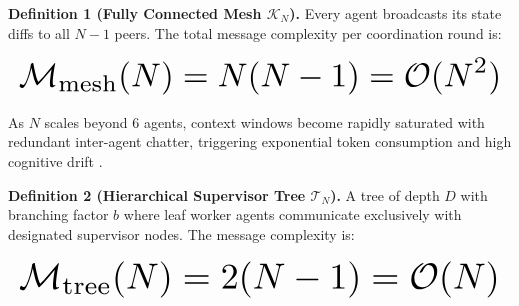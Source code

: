 \documentclass[11pt,a4paper]{article}
\begin{document}
\textbf{Definition 1 (Fully Connected Mesh $\mathcal{K}_N$).} Every agent broadcasts its state diffs to all $N-1$ peers. The total message complexity per coordination round is:






















\begin{equation}
\resizebox{\columnwidth}{!}{$\displaystyle
\begin{aligned}
\mathcal{M}_{\text{mesh}}(N) = N(N - 1) = \mathcal{O}(N^2)
\end{aligned}
$}
\end{equation}






















As $N$ scales beyond 6 agents, context windows become rapidly saturated with redundant inter-agent chatter, triggering exponential token consumption and high cognitive drift \cite{arxiv_2412_06333}.

\textbf{Definition 2 (Hierarchical Supervisor Tree $\mathcal{T}_N$).} A tree of depth $D$ with branching factor $b$ where leaf worker agents communicate exclusively with designated supervisor nodes. The message complexity is:






















\begin{equation}
\resizebox{\columnwidth}{!}{$\displaystyle
\begin{aligned}
\mathcal{M}_{\text{tree}}(N) = 2(N - 1) = \mathcal{O}(N)
\end{aligned}
$}
\end{equation}
\end{document}
